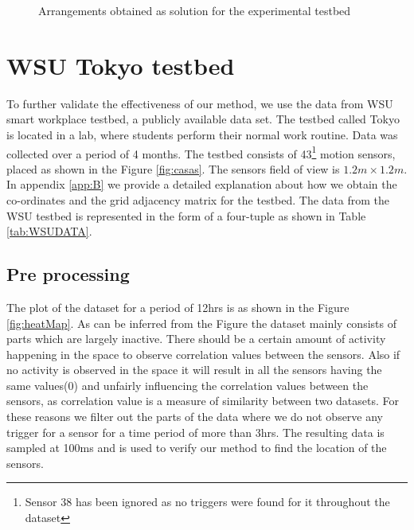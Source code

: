 \begin{figure}[!ht]
\caption{Arrangements obtained as solution for the experimental testbed}
\label{fig:arrangement4x2}
\centering
\end{figure}


\section{WSU Tokyo testbed}
To further validate the effectiveness of our method, we use the data from WSU smart workplace testbed\cite{cook2010detection}, a publicly available data set. The testbed called Tokyo is located in a lab,  where students perform their normal work routine. Data was collected over a period of 4 months. 
The testbed consists of 43\footnote{Sensor 38 has been ignored as no triggers were found for it throughout the dataset} motion sensors, placed as shown in the Figure \ref{fig:casas}. The sensors field of view is $1.2m \times 1.2m$. In appendix \ref{app:B} we provide a detailed explanation about how we obtain the co-ordinates and the grid adjacency matrix for the testbed. The data from the WSU testbed is represented in the form of a four-tuple as shown in Table \ref{tab:WSUDATA}. 
\subsection{Pre processing}
The plot of the dataset for a period of 12hrs is as shown in the Figure \ref{fig:heatMap}. As can be inferred from the Figure the dataset mainly consists of parts which are largely inactive. There should be a certain amount of activity happening in the space to observe correlation values between the sensors.  Also if  no activity is observed in the space it will result in all the sensors having the same values(0) and unfairly influencing the correlation values between the sensors, as correlation value is a measure of similarity between two datasets. For these reasons we filter out the parts of the data where we do not observe any trigger for a sensor for a time period of more than 3hrs. The resulting data is sampled at 100ms and is used to verify our method to find the location of the sensors.



